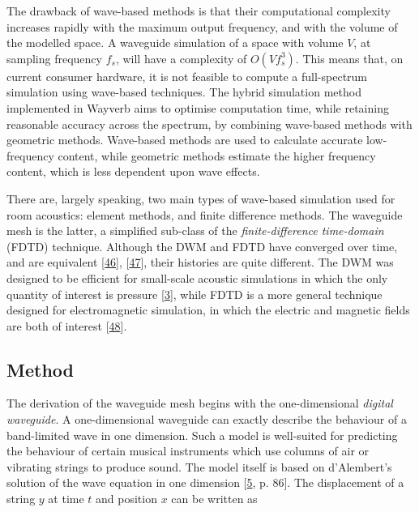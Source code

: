 \documentclass[]{scrreprt}
\begin{document}
The drawback of wave-based methods is that their computational
complexity increases rapidly with the maximum output frequency, and with
the volume of the modelled space. A waveguide simulation of a space with
volume \(V\), at sampling frequency \(f_s\), will have a complexity of
\(O(V f_s^3)\). This means that, on current consumer hardware, it is not
feasible to compute a full-spectrum simulation using wave-based
techniques. The hybrid simulation method implemented in Wayverb aims to
optimise computation time, while retaining reasonable accuracy across
the spectrum, by combining wave-based methods with geometric methods.
Wave-based methods are used to calculate accurate low-frequency content,
while geometric methods estimate the higher frequency content, which is
less dependent upon wave effects.

There are, largely speaking, two main types of wave-based simulation
used for room acoustics: element methods, and finite difference methods.
The waveguide mesh is the latter, a simplified sub-class of the
\emph{finite-difference time-domain} (FDTD) technique. Although the DWM
and FDTD have converged over time, and are equivalent
{[}\protect\hyperlink{ref-smithux5fiiiux5fequivalenceux5f2004}{46}{]},
{[}\protect\hyperlink{ref-karjalainenux5fdigitalux5f2004}{47}{]}, their
histories are quite different. The DWM was designed to be efficient for
small-scale acoustic simulations in which the only quantity of interest
is pressure {[}\protect\hyperlink{ref-smithux5fphysicalux5f1992}{3}{]},
while FDTD is a more general technique designed for electromagnetic
simulation, in which the electric and magnetic fields are both of
interest {[}\protect\hyperlink{ref-bottsux5fintegratingux5f2013}{48}{]}.

\subsection{Method}\label{method}

The derivation of the waveguide mesh begins with the one-dimensional
\emph{digital waveguide}. A one-dimensional waveguide can exactly
describe the behaviour of a band-limited wave in one dimension. Such a
model is well-suited for predicting the behaviour of certain musical
instruments which use columns of air or vibrating strings to produce
sound. The model itself is based on d'Alembert's solution of the wave
equation in one dimension
{[}\protect\hyperlink{ref-shelleyux5fdiffuseux5f2007}{5}, p. 86{]}. The
displacement of a string \(y\) at time \(t\) and position \(x\) can be
written as
\end{document}
